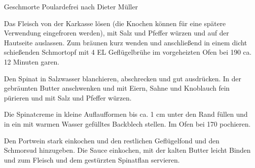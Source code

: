 \begin{recipe}{Geschmorte Poularde}{frei nach Dieter Müller}
  \label{Geschmorte Poulardenbrust}
  
  
  \steps
  Das Fleisch von der Karkasse lösen (die Knochen können für eine spätere Verwendung
  eingefroren werden), mit Salz und Pfeffer würzen und auf der Hautseite auslassen. Zum
  bräunen kurz wenden und anschließend in einem dicht schießenden Schmortopf mit 4 EL
  Geflügelbrühe im vorgeheizten Ofen bei 190 \celsius ca. 12 Minuten garen.

  Den Spinat in Salzwasser blanchieren, abschrecken und gut ausdrücken. In der gebräunten
  Butter anschwenken und mit Eiern, Sahne und Knoblauch fein pürieren und mit Salz und
  Pfeffer würzen.

  Die Spinatcreme in kleine Auflaufformen bis ca. 1 cm unter den Rand füllen und in ein
  mit warmen Wasser gefülltes Backblech stellen. Im Ofen bei 170 \celsius pochieren.

  Den Portwein stark einkochen und den restlichen Geflügelfond und den Schmorsud
  hinzugeben. Die Sauce einkochen, mit der kalten Butter leicht Binden und zum Fleisch
  und dem gestürzten Spinatflan servieren.
\end{recipe}
